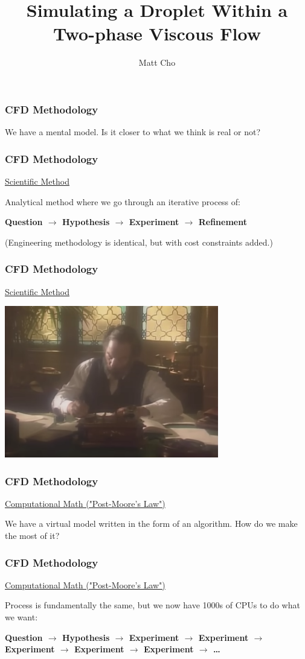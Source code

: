 \documentclass[12pt]{beamer}
\author{Matt Cho}
\title{Simulating a Droplet Within a Two-phase Viscous Flow}
\date{}
\begin{document}
\maketitle

\begin{frame}
    \frametitle{CFD Methodology}

    We have a mental model. Is it closer to what we think is real or not?
\end{frame}
\begin{frame}
    \frametitle{CFD Methodology}
    \underline{Scientific Method}

    Analytical method where we go through an iterative process of:

    \textbf{Question $\rightarrow$ Hypothesis $\rightarrow$ Experiment $\rightarrow$ Refinement}

    (Engineering methodology is identical, but with cost constraints added.)
\end{frame}
\begin{frame}
    \frametitle{CFD Methodology}
    \underline{Scientific Method}

    \includegraphics[width=0.7\textwidth]{img/0-caltech-maxwell.png}
\end{frame}
\begin{frame}
    \frametitle{CFD Methodology}
    \underline{Computational Math ("Post-Moore's Law")}

    We have a virtual model written in the form of an algorithm. How do we make the most of it?
\end{frame}
\begin{frame}
    \frametitle{CFD Methodology}
    \underline{Computational Math ("Post-Moore's Law")}

    Process is fundamentally the same, but we now have 1000s of CPUs to do 
    what we want:

    \textbf{Question $\rightarrow$ Hypothesis $\rightarrow$ Experiment $\rightarrow$ Experiment $\rightarrow$ Experiment $\rightarrow$ Experiment $\rightarrow$ Experiment $\rightarrow$ \dots}
\end{frame}
\end{document}
